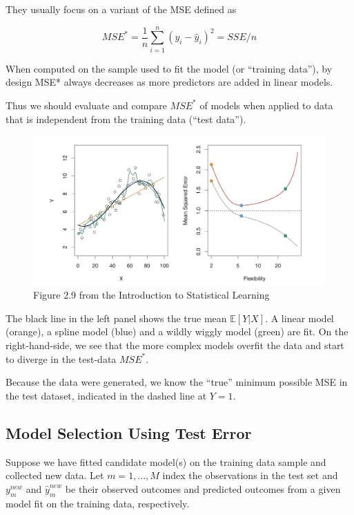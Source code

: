 \documentclass[
  letterpaper,
  DIV=11,
  numbers=noendperiod]{scrreport}
\begin{document}
They usually focus on a variant of the MSE defined as

\[MSE^* = \frac{1}{n} \sum_{i=1}^n (y_i - \hat y_i)^2 = SSE/n\]

When computed on the sample used to fit the model (or ``training
data''), by design MSE* always decreases as more predictors are added in
linear models.

Thus we should evaluate and compare \(MSE^*\) of models when applied to
data that is independent from the training data (``test data'').

\begin{figure}

{\centering \includegraphics[width=7.51in,height=\textheight]{week5/images/MSE.png}

}

\caption{Figure 2.9 from the Introduction to Statistical Learning}

\end{figure}

The black line in the left panel shows the true mean \(\mathbb E[Y|X]\).
A linear model (orange), a spline model (blue) and a wildly wiggly model
(green) are fit. On the right-hand-side, we see that the more complex
models overfit the data and start to diverge in the test-data \(MSE^*\).

Because the data were generated, we know the ``true'' minimum possible
MSE in the test dataset, indicated in the dashed line at \(Y=1\).

\hypertarget{model-selection-using-test-error}{%
\subsection{Model Selection Using Test
Error}\label{model-selection-using-test-error}}

Suppose we have fitted candidate model(s) on the training data sample
and collected new data. Let \(m = 1, ..., M\) index the observations in
the test set and \(y_m^{new}\) and \(\hat y_m^{new}\) be their observed
outcomes and predicted outcomes from a given model fit on the training
data, respectively.
\end{document}
